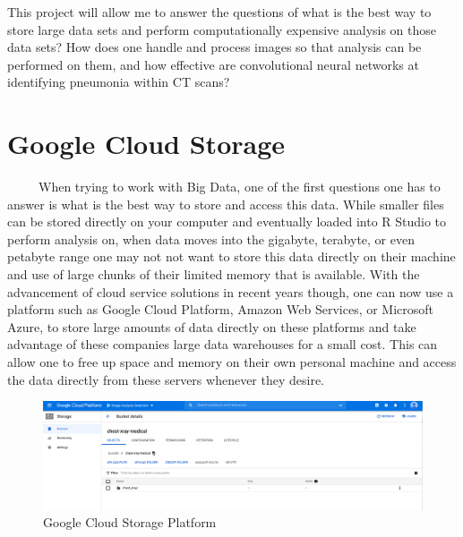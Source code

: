 \documentclass[12pt]{article}
\begin{document}
This project will allow me to answer the questions of what is the best
way to store large data sets and perform computationally expensive
analysis on those data sets? How does one handle and process images so
that analysis can be performed on them, and how effective are
convolutional neural networks at identifying pneumonia within CT scans?

\hypertarget{google-cloud-storage}{%
\section{Google Cloud Storage}\label{google-cloud-storage}}

~~~~~When trying to work with Big Data, one of the first questions one
has to answer is what is the best way to store and access this data.
While smaller files can be stored directly on your computer and
eventually loaded into R Studio to perform analysis on, when data moves
into the gigabyte, terabyte, or even petabyte range one may not not want
to store this data directly on their machine and use of large chunks of
their limited memory that is available. With the advancement of cloud
service solutions in recent years though, one can now use a platform
such as Google Cloud Platform, Amazon Web Services, or Microsoft Azure,
to store large amounts of data directly on these platforms and take
advantage of these companies large data warehouses for a small cost.
This can allow one to free up space and memory on their own personal
machine and access the data directly from these servers whenever they
desire.

\begin{figure}

{\centering \includegraphics[width=0.75\linewidth,height=0.25\textheight]{images/cloud_storage} 

}

\caption{Google Cloud Storage Platform}\label{fig:sample-fig2}
\end{figure}
\end{document}
